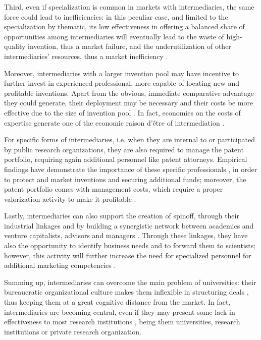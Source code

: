 Third, even if specialization is common in markets with intermediaries, the same force could lead to inefficiencies: in this peculiar case, and limited to the specialization by thematic, its low effectiveness in offering a balanced share of opportunities among intermediaries will eventually lead to the waste of high-quality invention, thus a market failure, and the underutilization of other intermediaries' resources, thus a market inefficiency \citep{Hoppe2005}.

Moreover, intermediaries with a larger invention pool may have incentive to further invest in experienced professional, more capable of locating new and profitable inventions. Apart from the obvious, immediate comparative advantage they could generate, their deployment may be necessary and their costs be more effective due to the size of invention pool \citep{Debackere2005}. In fact, economies on the costs of expertise generate one of the economic raison d'être of intermediation \citep{Hoppe2005}.

For specific forms of intermediaries, i.e. when they are internal to or participated by public research organizations, they are also required to manage the patent portfolio, requiring again additional personnel like patent attorneys. Empirical findings have demonstrate the importance of these specific professionals \citep{Siegel2003a}, in order to protect and market inventions and securing additional funds; moreover, the patent portfolio comes with management costs, which require a proper valorization activity to make it profitable \citep{Balderi2010}.

Lastly, intermediaries can also support the creation of spinoff, through their industrial linkages and by building a synergistic network between academics and venture capitalists, advisors and managers \citep{OShea2004}. Through these linkages, they have also the opportunity to identify business needs and to forward them to scientists; however, this activity will further increase the need for specialized personnel for additional marketing competencies \citep{Geuna2009,Muscio2008}. 

Summing up, intermediaries can overcome the main problem of universities: their bureaucratic organizational culture makes them inflexible in structuring deals \citep{Siegel2003a}, thus keeping them at a great cognitive distance from the market. In fact, intermediaries are becoming central, even if they may present some lack in effectiveness to most research institutions \citep{Geuna2009}, being them universities, research institutions or private research organization.

